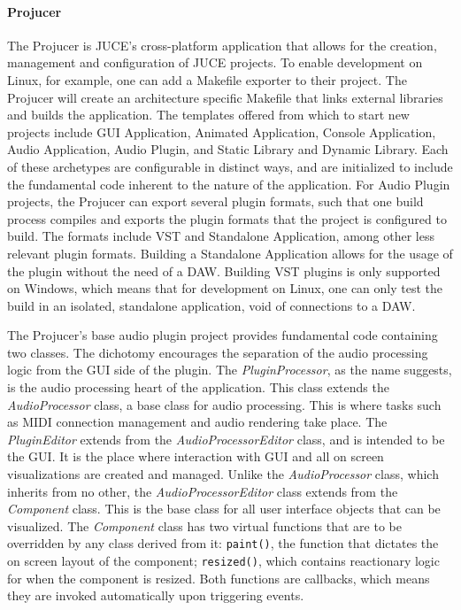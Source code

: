 \documentclass[12pt, a4paper, hidelinks]{article}
\begin{document}
	\paragraph{Projucer\\}
	The Projucer is JUCE's cross-platform application that allows for the creation, management and configuration of JUCE projects. To enable development on Linux, for example, one can add a Makefile exporter to their project. The Projucer will create an architecture specific Makefile that links external libraries and builds the application. The templates offered from which to start new projects include GUI Application, Animated Application, Console Application, Audio Application, Audio Plugin, and Static Library and Dynamic Library. Each of these archetypes are configurable in distinct ways, and are initialized to include the fundamental code inherent to the nature of the application. For Audio Plugin projects, the Projucer can export several plugin formats, such that one build process compiles and exports the plugin formats that the project is configured to build. The formats include VST and Standalone Application, among other less relevant plugin formats. Building a Standalone Application allows for the usage of the plugin without the need of a DAW. Building VST plugins is only supported on Windows, which means that for development on Linux, one can only test the build in an isolated, standalone application, void of connections to a DAW. \par
	
	The Projucer's base audio plugin project provides fundamental code containing two classes. The dichotomy encourages the separation of the audio processing logic from the GUI side of the plugin. The \textit{PluginProcessor}, as the name suggests, is the audio processing heart of the application. This class extends the \textit{AudioProcessor} class, a base class for audio processing. This is where tasks such as MIDI connection management and audio rendering take place. The \textit{PluginEditor} extends from the \textit{AudioProcessorEditor} class, and is intended to be the GUI. It is the place where interaction with GUI and all on screen visualizations are created and managed. Unlike the \textit{AudioProcessor} class, which inherits from no other, the \textit{AudioProcessorEditor} class extends from the \textit{Component} class. This is the base class for all user interface objects that can be visualized. The \textit{Component} class has two virtual functions that are to be overridden by any class derived from it: \texttt{paint()}, the function that dictates the on screen layout of the component; \texttt{resized()}, which contains reactionary logic for when the component is resized. Both functions are callbacks, which means they are invoked automatically upon triggering events.\par
	
\end{document}

